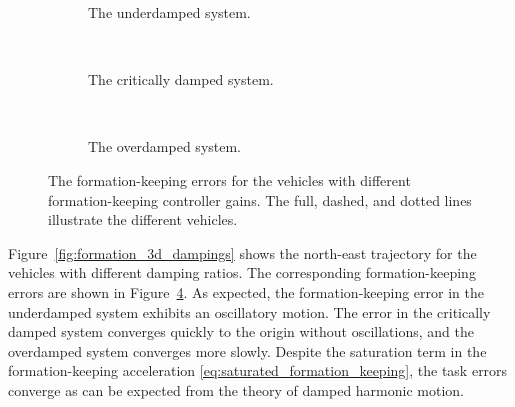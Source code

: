 \begin{figure}[htbp]
    \centering
    \begin{subfigure}[t]{.9\textwidth}
    \centering
    \setlength{}
    \setlength\figureheight{3cm}
    
    \vspace*{-2mm}
    \caption{The underdamped system.}
    \label{fig:underdamped_formation}
    \end{subfigure}
    \\
    \begin{subfigure}[t]{.9\textwidth}
    \centering
    \setlength{}
    \setlength\figureheight{3cm}
    
    \vspace*{-2mm}
    \caption{The critically damped system. }
    \label{fig:critically_damped_formation}
    \end{subfigure}
    \\
    \begin{subfigure}[t]{.9\textwidth}
    \centering
    \setlength{}
    \setlength\figureheight{3cm}
    
    \vspace*{-2mm}
    \caption{The overdamped system.}
    \label{fig:overdamped_formation}
    \end{subfigure}
    \vspace*{-2mm}
    \caption{The formation-keeping errors for the vehicles with different formation-keeping controller gains. The full, dashed, and dotted lines illustrate the different vehicles.}
    \label{fig:formation_dampings_errors}
\end{figure}

Figure~\ref{fig:formation_3d_dampings} shows the north-east trajectory for the vehicles with different damping ratios. The corresponding formation-keeping errors are shown in Figure~\ref{fig:formation_dampings_errors}. As expected, the formation-keeping error in the underdamped system exhibits an oscillatory motion. The error in the critically damped system converges quickly to the origin without oscillations, and the overdamped system converges more slowly. Despite the saturation term in the formation-keeping acceleration \eqref{eq:saturated_formation_keeping}, the task errors converge as can be expected from the theory of damped harmonic motion.

\vspace{-3mm}
